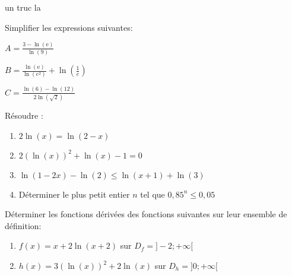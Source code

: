 \documentclass{cornouaille}
\begin{document}

\begin{definiton}

un truc la

\end{definiton}

\Bareme
\begin{exercice}
	Simplifier les expressions suivantes:
	\begin{multicols}{3}
	$A=\frac{3-\ln(\text{e})}{\ln(9)}$\\
	\ldotcarreaux[5]
	
		$B=\frac{\ln(\text{e})}{\ln(e^2)}+ \ln\left(\frac{1}{e}\right)$\\
	\ldotcarreaux[5]
	
			$C=\frac{\ln(6)-\ln(12)}{2\ln(\sqrt{2})}$\\
	\ldotcarreaux[5]
	\end{multicols}
\end{exercice}
\begin{exercice}
Résoudre :
\begin{enumerate}
	\item $2\ln(x)=\ln(2-x)$\\
	\ldotcarreaux[7]
	\item $2(\ln(x))^2+\ln(x)-1=0$\\
	\ldotcarreaux[7]
	\item $\ln(1-2x)-\ln(2)\leq \ln(x+1)+\ln(3)$\\
	\ldotcarreaux[7]
	\item Déterminer le plus petit entier $n$ tel que $0,85^n\leq 0,05$\\
	\ldotcarreaux[7]
\end{enumerate}	
\end{exercice}
\begin{exercice}[Dérivation][2.5]
	Déterminer les fonctions dérivées des fonctions suivantes sur leur ensemble de définition:
	\begin{enumerate}
		\item $f(x)=x+2\ln(x+2)$ sur $D_f=]-2;+\infty[$\\
	\ldotcarreaux[6]
		\item $h(x)=3(\ln(x))^2+2\ln(x)$ sur $D_h=]0;+\infty[$\\
	\ldotcarreaux[6]
	\end{enumerate}
\end{exercice}
\end{document}
